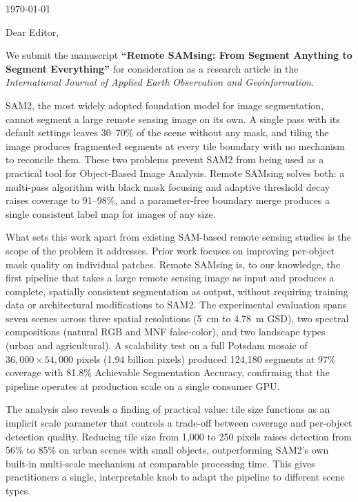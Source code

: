 \documentclass[11pt]{article}
\begin{document}
\noindent\today

\vspace{1cm}
\noindent Dear Editor,

\vspace{0.5cm}
\noindent We submit the manuscript \textbf{``Remote SAMsing: From Segment Anything to Segment Everything''} for consideration as a research article in the \textit{International Journal of Applied Earth Observation and Geoinformation}.

SAM2, the most widely adopted foundation model for image segmentation, cannot segment a large remote sensing image on its own. A single pass with its default settings leaves 30--70\% of the scene without any mask, and tiling the image produces fragmented segments at every tile boundary with no mechanism to reconcile them. These two problems prevent SAM2 from being used as a practical tool for Object-Based Image Analysis. Remote SAMsing solves both: a multi-pass algorithm with black mask focusing and adaptive threshold decay raises coverage to 91--98\%, and a parameter-free boundary merge produces a single consistent label map for images of any size.

What sets this work apart from existing SAM-based remote sensing studies is the scope of the problem it addresses. Prior work focuses on improving per-object mask quality on individual patches. Remote SAMsing is, to our knowledge, the first pipeline that takes a large remote sensing image as input and produces a complete, spatially consistent segmentation as output, without requiring training data or architectural modifications to SAM2. The experimental evaluation spans seven scenes across three spatial resolutions (5~cm to 4.78~m GSD), two spectral compositions (natural RGB and MNF false-color), and two landscape types (urban and agricultural). A scalability test on a full Potsdam mosaic of $36{,}000 \times 54{,}000$ pixels (1.94 billion pixels) produced 124{,}180 segments at 97\% coverage with 81.8\% Achievable Segmentation Accuracy, confirming that the pipeline operates at production scale on a single consumer GPU.

The analysis also reveals a finding of practical value: tile size functions as an implicit scale parameter that controls a trade-off between coverage and per-object detection quality. Reducing tile size from 1{,}000 to 250 pixels raises detection from 56\% to 85\% on urban scenes with small objects, outperforming SAM2's own built-in multi-scale mechanism at comparable processing time. This gives practitioners a single, interpretable knob to adapt the pipeline to different scene types.
\end{document}
